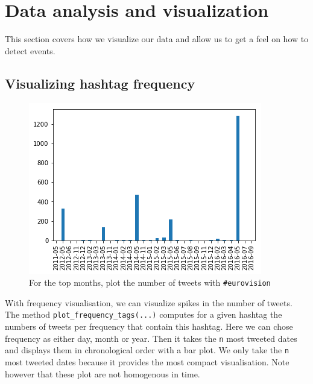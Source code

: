 \documentclass[11pt]{article}
\begin{document}
\section{Data analysis and visualization}

This section covers how we visualize our data and allow us to get a feel on how to detect events.

\subsection{Visualizing hashtag frequency}

\begin{figure}[htbp]
  \vspace*{-1mm}
  \centering
  \includegraphics[width=\columnwidth]{figures/freq_month_eurovision.png}
  \vspace{-5mm}
  \caption{For the top months, plot the number of tweets with  \texttt{\#eurovision}}
  \label{fig:freq_month_eurovision}
\end{figure}

With frequency visualisation, we can visualize spikes in the number of tweets. The method \texttt{plot\_frequency\_tags(...)} computes for a given hashtag the numbers of tweets per frequency that contain this hashtag. Here we can chose frequency as either day, month or year. Then it takes the \texttt{n} most tweeted dates and displays them in chronological order with a bar plot. We only take the \texttt{n} most tweeted dates because it provides the most compact visualisation. Note however that these plot are not homogenous in time. 
\end{document}
